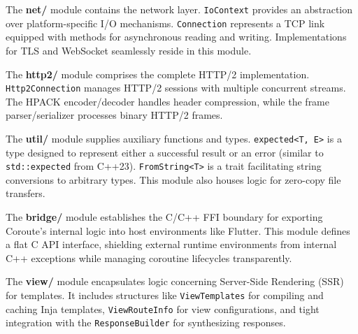 The \textbf{net/} module contains the network layer. \texttt{IoContext} provides an abstraction over platform-specific I/O mechanisms. \texttt{Connection} represents a TCP link equipped with methods for asynchronous reading and writing. Implementations for TLS and WebSocket seamlessly reside in this module.

The \textbf{http2/} module comprises the complete HTTP/2 implementation. \texttt{Http2Connection} manages HTTP/2 sessions with multiple concurrent streams. The HPACK encoder/decoder handles header compression, while the frame parser/serializer processes binary HTTP/2 frames.

The \textbf{util/} module supplies auxiliary functions and types. \texttt{expected<T, E>} is a type designed to represent either a successful result or an error (similar to \texttt{std::expected} from C++23). \texttt{FromString<T>} is a trait facilitating string conversions to arbitrary types. This module also houses logic for zero-copy file transfers.

The \textbf{bridge/} module establishes the C/C++ FFI boundary for exporting Coroute's internal logic into host environments like Flutter. This module defines a flat C API interface, shielding external runtime environments from internal C++ exceptions while managing coroutine lifecycles transparently.

The \textbf{view/} module encapsulates logic concerning Server-Side Rendering (SSR) for templates. It includes structures like \texttt{ViewTemplates} for compiling and caching Inja templates, \texttt{ViewRouteInfo} for view configurations, and tight integration with the \texttt{ResponseBuilder} for synthesizing responses.

